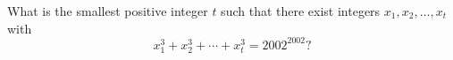 What is the smallest positive integer $t$ such that there exist integers $x_1,x_2,\ldots,x_t$ with \[x_1^3+x_2^3+\cdots+x_t^3=2002^{2002}?\]